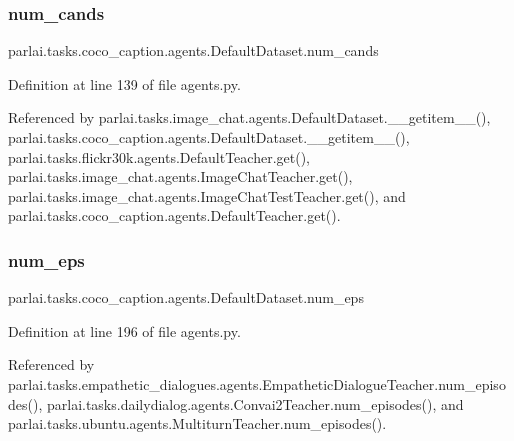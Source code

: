 \subsubsection{\texorpdfstring{num\+\_\+cands}{num\_cands}}
{\footnotesize\ttfamily parlai.\+tasks.\+coco\+\_\+caption.\+agents.\+Default\+Dataset.\+num\+\_\+cands}



Definition at line 139 of file agents.\+py.



Referenced by parlai.\+tasks.\+image\+\_\+chat.\+agents.\+Default\+Dataset.\+\_\+\+\_\+getitem\+\_\+\+\_\+(), parlai.\+tasks.\+coco\+\_\+caption.\+agents.\+Default\+Dataset.\+\_\+\+\_\+getitem\+\_\+\+\_\+(), parlai.\+tasks.\+flickr30k.\+agents.\+Default\+Teacher.\+get(), parlai.\+tasks.\+image\+\_\+chat.\+agents.\+Image\+Chat\+Teacher.\+get(), parlai.\+tasks.\+image\+\_\+chat.\+agents.\+Image\+Chat\+Test\+Teacher.\+get(), and parlai.\+tasks.\+coco\+\_\+caption.\+agents.\+Default\+Teacher.\+get().

\mbox{\label{classparlai_1_1tasks_1_1coco__caption_1_1agents_1_1DefaultDataset_a462ef75e6b3c527a476d8f76321276a1}} 
\subsubsection{\texorpdfstring{num\+\_\+eps}{num\_eps}}
{\footnotesize\ttfamily parlai.\+tasks.\+coco\+\_\+caption.\+agents.\+Default\+Dataset.\+num\+\_\+eps}



Definition at line 196 of file agents.\+py.



Referenced by parlai.\+tasks.\+empathetic\+\_\+dialogues.\+agents.\+Empathetic\+Dialogue\+Teacher.\+num\+\_\+episodes(), parlai.\+tasks.\+dailydialog.\+agents.\+Convai2\+Teacher.\+num\+\_\+episodes(), and parlai.\+tasks.\+ubuntu.\+agents.\+Multiturn\+Teacher.\+num\+\_\+episodes().

\mbox{\label{classparlai_1_1tasks_1_1coco__caption_1_1agents_1_1DefaultDataset_a288a755d6c7400a08f4db1a4ed6b3bbc}} 
